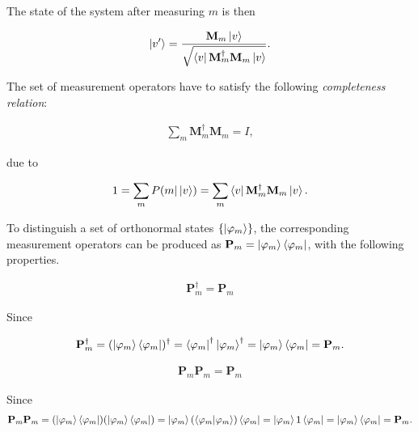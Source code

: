 The state of the system after measuring $m$ is then

\begin{align*}
    \ket{v'} = \frac{\mathbf{M}_m\ket{v}}{\sqrt{\bra{v} \mathbf{M}_m^{\dagger} \mathbf{M}_m \ket{v}}}.
\end{align*}

The set of measurement operators have to satisfy the following \textit{completeness relation}:

\begin{align*}
    \sum\limits_{m}  \mathbf{M}_m^{\dagger} \mathbf{M}_m = I,
\end{align*}

due to

\begin{align*}
    1 = \sum\limits_{m} P(m | \ket{v}) = \sum\limits_{m} \bra{v} \mathbf{M}_m^{\dagger} \mathbf{M}_m \ket{v}.
\end{align*}

\label{PostulateIIIProjective}

To distinguish a set of orthonormal states $\{\ket{\varphi_m}\}$, the corresponding measurement operators can be produced as $\mathbf{P}_m = \ket{\varphi_m}\bra{\varphi_m}$, with the following properties.

\begin{property}

\begin{align*}
\mathbf{P}_m^{\dagger} = \mathbf{P}_m
\end{align*}

Since

\begin{align*}
\mathbf{P}_m^{\dagger} =
(\ket{\varphi_m}\bra{\varphi_m})^{\dagger} =
\bra{\varphi_m}^{\dagger}\ket{\varphi_m}^{\dagger} =
\ket{\varphi_m}\bra{\varphi_m} =
\mathbf{P}_m.
\end{align*}

\end{property}

\begin{property}

\begin{align*}
\mathbf{P}_m\mathbf{P}_m = \mathbf{P}_m
\end{align*}

Since
\begin{align*}
\mathbf{P}_m\mathbf{P}_m =
(\ket{\varphi_m}\bra{\varphi_m})(\ket{\varphi_m}\bra{\varphi_m}) =
\ket{\varphi_m}(\bra{\varphi_m}\ket{\varphi_m})\bra{\varphi_m} =
\ket{\varphi_m}1\bra{\varphi_m} =
\ket{\varphi_m}\bra{\varphi_m} =
\mathbf{P}_m.
\end{align*}

\end{property}

